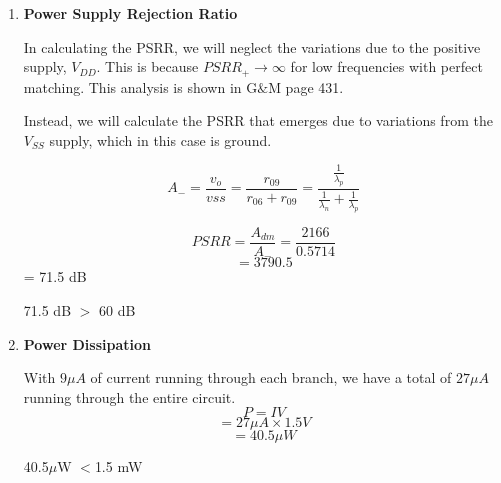 \documentclass[]{article}
\begin{document}
\begin{enumerate}


		\pagebreak

	\item %
		{\bf Power Supply Rejection Ratio}
		\newline

		In calculating the PSRR, we will neglect the variations due to the positive supply, $V_{DD}$. This is because $PSRR_{+}\rightarrow \infty $ for low frequencies with perfect matching. This analysis is shown in G$\&$M page 431.

		Instead, we will calculate the PSRR that emerges due to variations from the $V_{SS}$ supply, which in this case is ground.

		\begin{center} 
			$$A_{-} = \frac{v_{o}}{vss} = \frac{r_{09}}{r_{06}+r_{09}} = \frac{\frac{1}{\lambda_{p}}}{\frac{1}{\lambda_{n}}+\frac{1}{\lambda_{p}}}$$

			$$PSRR = \frac{A_{dm}}{A_{-}} = \frac{2166}{0.5714}$$
			$$ = 3790.5$$
			= 71.5 dB 

			71.5 dB $>$ 60 dB
		\end{center} 
		\pagebreak

	\item %

		{\bf Power Dissipation}
		\newline

		With $9\mu A$ of current running through each branch, we have a total of $27 \mu A$ running through the entire circuit.
		$$ P = IV$$
		$$ = 27 \mu A \times 1.5V $$
		$$ = 40.5 \mu W $$

		\begin{center}
			40.5$\mu$W $<$1.5 mW
		\end{center}
		
	\pagebreak	

\end{enumerate}
\end{document}
